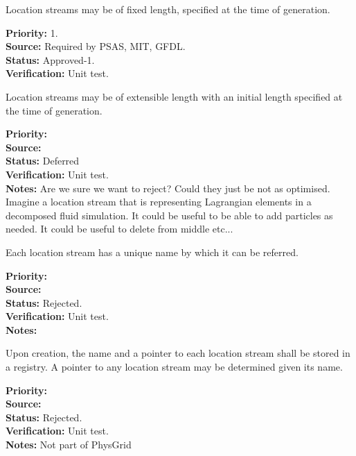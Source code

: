 
Location streams may be of fixed length, specified at the time of generation.
\begin{reqlist}
{\bf Priority:} 1. \\
{\bf Source:} Required by PSAS, MIT, GFDL.\\
{\bf Status:} Approved-1. \\
{\bf Verification:} Unit test. 
\end{reqlist}

Location streams may be of extensible length
with an initial length specified at the time of generation.
\begin{reqlist}
{\bf Priority:} \\
{\bf Source:} \\
{\bf Status:} Deferred \\
{\bf Verification:} Unit test.\\
{\bf Notes:} Are we sure we want to reject? Could they just be
not as optimised. Imagine a location stream that is representing Lagrangian
elements in a decomposed fluid simulation. It could be useful to
be able to add particles as needed. It could be useful to delete
from middle etc...
\end{reqlist}

Each location stream has a unique name by which it can be referred.
\begin{reqlist}
{\bf Priority:} \\
{\bf Source:} \\
{\bf Status:} Rejected. \\
{\bf Verification:} Unit test. \\
{\bf Notes:}
\end{reqlist}

Upon creation, the name and a pointer to each location stream shall be stored in a
registry.  A pointer to any location stream may be determined given its name.
\begin{reqlist}
{\bf Priority:} \\
{\bf Source:} \\
{\bf Status:} Rejected. \\
{\bf Verification:} Unit test. \\
{\bf Notes:} Not part of PhysGrid
\end{reqlist}

